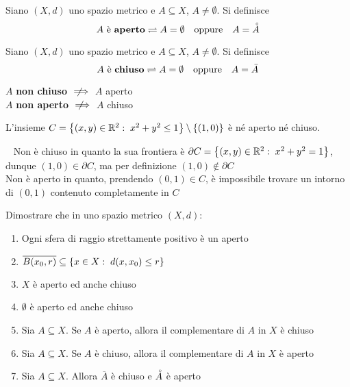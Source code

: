 \begin{definition}
	\label{def:aperto}
	Siano $(X,d)$ uno spazio metrico e $A\subseteq X$, $A \neq \emptyset$. Si definisce
	\[A\text{ è \textbf{aperto}}\rightleftharpoons A=\emptyset\quad\text{oppure}\quad A=\accentset{\circ}{A}\]
\end{definition}
\begin{definition}
	\label{def:chiuso}
	Siano $(X,d)$ uno spazio metrico e $A\subseteq X$, $A \neq \emptyset$. Si definisce
	\[A\text{ è \textbf{chiuso}}\rightleftharpoons A=\emptyset\quad\text{oppure}\quad A=\bar{A}\]
\end{definition}
\begin{observation}
	$A$ \textbf{non chiuso} $\notimplies$ $A$ aperto\\
	$A$ \textbf{non aperto} $\notimplies$ $A$ chiuso
\end{observation}
\begin{example}
	\label{ex:ins_non_ap_non_chius}
	L'insieme $C = \left\{(x,y) \in \mathbb{R}^2:\; x^2+y^2 \leq 1\right\} \setminus \left\{(1,0)\right\}$ è né aperto né chiuso.
	\begin{solution}~\newline
		Non è chiuso in quanto la sua frontiera è $\partial C = \left\{(x,y) \in \mathbb{R}^2:\; x^2+y^2 = 1\right\}$, dunque $(1,0) \in \partial C$, ma per definizione $(1,0) \notin \partial C$\\
		Non è aperto in quanto, prendendo $(0,1) \in C$, è impossibile trovare un intorno di $(0,1)$ contenuto completamente in $C$
	\end{solution}
\end{example}
\begin{exercise}
	Dimostrare che in uno spazio metrico $(X,d)$:
	\begin{enumerate}
		\item Ogni sfera di raggio strettamente positivo è un aperto
		\item $\overline{B(x_0,r)} \subseteq \left\{x \in X:\; d(x,x_0) \leq r\right\}$
		\item $X$ è aperto ed anche chiuso
		\item $\emptyset$ è aperto ed anche chiuso
		\item Sia $A \subseteq X$. Se $A$ è aperto, allora il complementare di $A$ in $X$ è chiuso
		\item Sia $A \subseteq X$. Se $A$ è chiuso, allora il complementare di $A$ in $X$ è aperto
		\item Sia $A \subseteq X$. Allora $\overline{A}$ è chiuso e $\accentset{\circ}{A}$ è aperto
	\end{enumerate}
\end{exercise}
